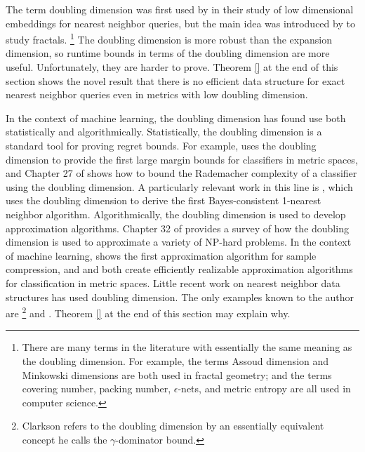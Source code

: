 \documentclass[../main.tex]{subfiles}
\begin{document}
The term doubling dimension was first used by \citet{gupta2003bounded} in their study of low dimensional embeddings for nearest neighbor queries,
but the main idea was introduced by \citet{assoud1979etude} to study fractals.%
\footnote{
    There are many terms in the literature with essentially the same meaning as the doubling dimension.
    For example, the terms Assoud dimension and Minkowski dimensions are both used in fractal geometry;
    and the terms covering number, packing number, $\epsilon$-nets, and metric entropy are all used in computer science. 
}
The doubling dimension is more robust than the expansion dimension,
so runtime bounds in terms of the doubling dimension are more useful. 
Unfortunately, they are harder to prove.
Theorem \ref{} at the end of this section shows the novel result that there is no efficient data structure for exact nearest neighbor queries even in metrics with low doubling dimension.

In the context of machine learning, the doubling dimension has found use both statistically and algorithmically.
Statistically, the doubling dimension is a standard tool for proving regret bounds.
For example, \citet{luxburg2004distance} uses the doubling dimension to provide the first large margin bounds for classifiers in metric spaces,
and Chapter 27 of \cite{shalev2014understanding} shows how to bound the Rademacher complexity of a classifier using the doubling dimension.
A particularly relevant work in this line is \citet{kontorovich2015bayes},
which uses the doubling dimension to derive the first Bayes-consistent 1-nearest neighbor algorithm.
Algorithmically, the doubling dimension is used to develop approximation algorithms.
Chapter 32 of \cite{toth2017handbook} provides a survey of how the doubling dimension is used to approximate a variety of NP-hard problems.
In the context of machine learning, \citet{gottlieb2014near} shows the first approximation algorithm for sample compression,
and
\citet{gottlieb2014efficient} and \citet{gottlieb2017efficient} both create efficiently realizable approximation algorithms for classification in metric spaces.
Little recent work on nearest neighbor data structures has used doubling dimension.
The only examples known to the author are \citet{clarkson1997nearest}\footnote{Clarkson refers to the doubling dimension by an essentially equivalent concept he calls the $\gamma$-dominator bound.} and \citet{krauthgamer2004navigating}.
Theorem \ref{} at the end of this section may explain why.
\end{document}
